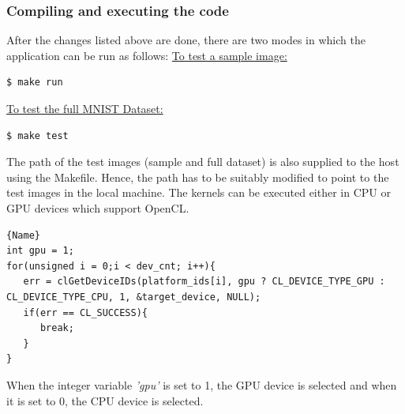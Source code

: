 \subsubsection{Compiling and executing the code}
\label{4_1_3_4}
After the changes listed above are done, there are two modes in which the application can be run as follows:\newline\newline
\underline{To test a sample image:}\newline
\begin{scriptsize}
\linuxbash
\begin{lstlisting}
$ make run
\end{lstlisting}
\end{scriptsize}
\underline{To test the full MNIST Dataset:}\newline
\begin{scriptsize}
\linuxbash
\begin{lstlisting}
$ make test
\end{lstlisting}
\end{scriptsize}
The path of the test images (sample and full dataset) is also supplied to the host using the Makefile. Hence, the path has to be suitably modified to point to the test images in the local machine.\newline\newline
The kernels can be executed either in CPU or GPU devices which support OpenCL.\newline
\hfill
\begin{minipage}{\textwidth}
\begin{center}
\begin{lstlisting}[caption= CPU or GPU Device Selection,frame=tlrb]{Name}
int gpu = 1;
for(unsigned i = 0;i < dev_cnt; i++){
   err = clGetDeviceIDs(platform_ids[i], gpu ? CL_DEVICE_TYPE_GPU : CL_DEVICE_TYPE_CPU, 1, &target_device, NULL);
   if(err == CL_SUCCESS){
      break;
   }
}
\end{lstlisting}
\end{center}
\end{minipage}
When the integer variable \textit{'gpu'} is set to 1, the GPU device is selected and when it is set to 0, the CPU device is selected.
